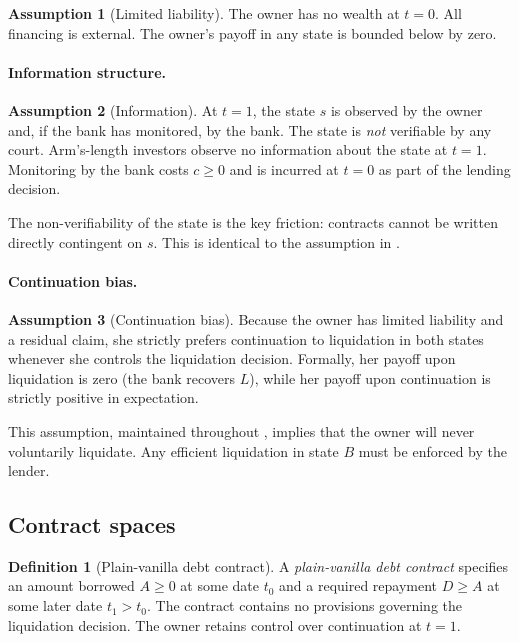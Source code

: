 \documentclass[12pt,a4paper]{article}
\theoremstyle{plain}
\theoremstyle{definition}
\newtheorem{definition}[theorem]{Definition}
\newtheorem{assumption}{Assumption}
\theoremstyle{remark}
\begin{document}
\begin{assumption}[Limited liability]
\label{a:limited_liability}
The owner has no wealth at $t=0$. All financing is external. The owner's payoff in
any state is bounded below by zero.
\end{assumption}

\paragraph{Information structure.}
\begin{assumption}[Information]
\label{a:information}
At $t=1$, the state $s$ is observed by the owner and, if the bank has monitored, by
the bank. The state is \emph{not} verifiable by any court. Arm's-length investors
observe no information about the state at $t=1$. Monitoring by the bank costs $c \geq 0$
and is incurred at $t=0$ as part of the lending decision.
\end{assumption}

The non-verifiability of the state is the key friction: contracts cannot be written
directly contingent on $s$. This is identical to the assumption in \citet{Rajan1992}.

\paragraph{Continuation bias.}
\begin{assumption}[Continuation bias]
\label{a:continuation_bias}
Because the owner has limited liability and a residual claim, she strictly prefers
continuation to liquidation in both states whenever she controls the liquidation
decision. Formally, her payoff upon liquidation is zero (the bank recovers $L$), while
her payoff upon continuation is strictly positive in expectation.
\end{assumption}

This assumption, maintained throughout \citet{Rajan1992}, implies that the owner
will never voluntarily liquidate. Any efficient liquidation in state $B$ must be
enforced by the lender.

\subsection{Contract spaces}

\begin{definition}[Plain-vanilla debt contract]
\label{d:plain_vanilla}
A \emph{plain-vanilla debt contract} specifies an amount borrowed $A \geq 0$ at some
date $t_0$ and a required repayment $D \geq A$ at some later date $t_1 > t_0$. The
contract contains no provisions governing the liquidation decision. The owner retains
control over continuation at $t=1$.
\end{definition}
\end{document}
